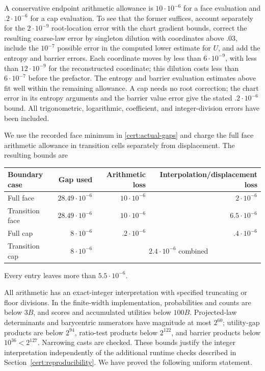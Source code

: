 \documentclass[11pt]{article}
\numberwithin{equation}{section}
\theoremstyle{definition}
\theoremstyle{remark}
\begin{document}
A conservative endpoint arithmetic allowance is $10\cdot10^{-6}$ for
a face evaluation and $.2\cdot10^{-6}$ for a cap evaluation.  To see
that the former suffices, account separately for the $2\cdot10^{-9}$
root-location error with the chart gradient bounds, correct the resulting
coarse-law error by singleton dilution with coordinates above $.03$,
include the $10^{-7}$ possible error in the computed lower estimate for
$U$, and add the entropy and barrier errors.  Each coordinate moves by
less than $6\cdot10^{-9}$, with less than $12\cdot10^{-9}$ for the
reconstructed coordinate; this dilution costs less than $6\cdot10^{-7}$
before the prefactor.  The entropy and barrier evaluation estimates above
fit well within the remaining allowance.  A cap needs no root correction;
the chart error in its entropy arguments and the barrier value error give
the stated $.2\cdot10^{-6}$ bound.  All trigonometric, logarithmic,
coefficient, and integer-division errors have been included.

We use the recorded face minimum in \eqref{cert:actual-gaps} and charge
the full face arithmetic allowance in transition cells separately from
displacement.  The resulting bounds are
\begin{center}
\begin{tabular}{lrrr}\toprule
Boundary case&Gap used&Arithmetic loss&Interpolation/displacement loss\\\midrule
Full face&$28.49\cdot10^{-6}$&$10\cdot10^{-6}$&$2\cdot10^{-6}$\\
Transition face&$28.49\cdot10^{-6}$&$10\cdot10^{-6}$&$6.5\cdot10^{-6}$\\
Full cap&$8\cdot10^{-6}$&$.2\cdot10^{-6}$&$.4\cdot10^{-6}$\\
Transition cap&$8\cdot10^{-6}$&\multicolumn{2}{c}{$2.4\cdot10^{-6}$ combined}\\\bottomrule
\end{tabular}
\end{center}
Every entry leaves more than $5.5\cdot10^{-6}$.

All arithmetic has an exact-integer interpretation with specified
truncating or floor divisions.  In the finite-width implementation,
probabilities and counts are below $3B$, and scores and accumulated
utilities below $100B$.  Projected-law determinants and barycentric
numerators have magnitude at most $2^{60}$; utility-gap products are
below $2^{94}$, ratio-test products below $2^{122}$, and barrier
products below $10^{36}<2^{127}$.  Narrowing casts are checked.
These bounds justify the integer interpretation independently of the
additional runtime checks described in Section~\ref{cert:reproducibility}.
We have proved the following uniform statement.
\end{document}
